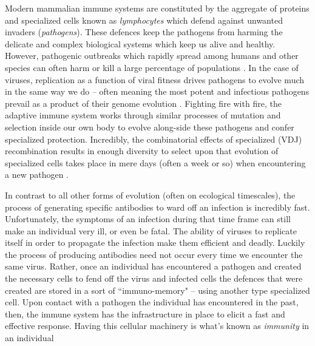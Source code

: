 \documentclass{article}
\begin{document}
Modern mammalian immune systems are constituted by the aggregate of proteins and specialized cells known as \textit{lymphocytes} which defend against unwanted invaders (\textit{pathogens}).
These defences keep the pathogens from harming the delicate and complex biological systems which keep us alive and healthy.
However, pathogenic outbreaks which rapidly spread among humans and other species can often harm or kill a large percentage of populations \citep{Wu2020}.
In the case of viruses, replication as a function of viral fitness drives pathogens to evolve much in the same way we do -- often meaning the most potent and infectious pathogens prevail as a product of their genome evolution \citep{Twiddy2003, Felsenstein1981-zs}.
Fighting fire with fire, the adaptive immune system works through similar processes of mutation and selection inside our own body to evolve along-side these pathogens and confer specialized protection.
Incredibly, the combinatorial effects of specialized (VDJ) recombination results in enough diversity to select upon that evolution of specialized cells
takes place in mere days (often a week or so) when encountering a new pathogen \citep{Jung2004}.


In contrast to all other forms of evolution (often on ecological timescales), 
the process of generating specific antibodies to ward off an infection is incredibly fast.
Unfortunately, the symptoms of an infection during that time frame can still make an individual very ill, or even be fatal.
The ability of viruses to replicate itself in order to propagate the infection make them efficient and deadly.
Luckily the process of producing antibodies need not occur every time we encounter the same virus.
Rather, once an individual has encountered a pathogen and created the necessary cells to fend off the virus and infected cells the defences that were created are stored in a sort of ``immuno-memory" -- using another type specialized cell.
Upon contact with a pathogen the individual has encountered in the past, then,
the immune system has the infrastructure in place to elicit a fast and effective response.
Having this cellular machinery is what's known as \textit{immunity} in an individual
\end{document}
